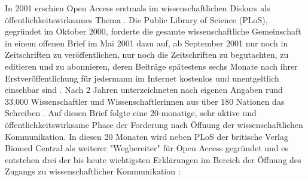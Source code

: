 In 2001 erschien Open Access erstmals im wissenschaftlichen Diskurs als öffentlichkeitswirksames Thema \cite{SCIENCE_Editors_2001} \cite{Roberts_2001}. Die Public Library of Science (PLoS), gegründet im Oktober 2000, forderte die gesamte wissenschaftliche Gemeinschaft in einem offenen Brief im Mai 2001 dazu auf, ab September 2001 nur noch in Zeitschriften zu veröffentlichen, nur noch die Zeitschriften zu begutachten, zu editieren und zu abonnieren, deren Beiträge spätestens sechs Monate nach ihrer Erstveröffentlichung für jedermann im Internet kostenlos und unentgeltlich einsehbar sind \cite{PLOS_2000}. Nach 2 Jahren unterzeichneten nach eigenen Angaben rund 33.000 Wissenschaftler und Wissenschaftlerinnen aus über 180 Nationen das Schreiben \cite{PLOS_2003}. Auf diesen Brief folgte eine 20-monatige, sehr aktive und öffentlichkeitswirksame Phase der Forderung nach Öffnung der wissenschaftlichen Kommunikation. In diesen 20 Monaten wird neben PLoS der britische Verlag Biomed Central als weiterer "Wegbereiter" für Open Access \cite[:8]{Hofmann_2016} gegründet und es entstehen drei der bis heute wichtigsten Erklärungen im Bereich der Öffnung des Zugangs zu wissenschaftlicher Kommunikation \cite{CREATe_2014}:
